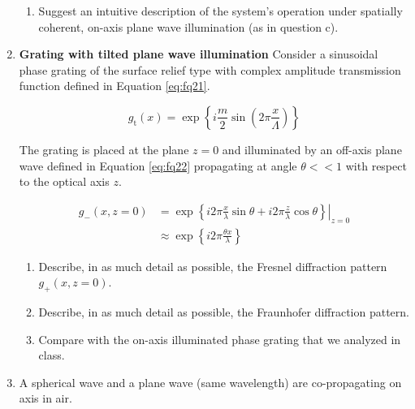 \documentclass[main.tex]{subfiles}
\begin{document}
\begin{enumerate}
\begin{enumerate}
\item{Suggest an intuitive description of the system's operation under spatially coherent, on-axis plane wave illumination (as in question c)}.

\end{enumerate}

\item{\textbf{Grating with tilted plane wave illumination} Consider a sinusoidal phase grating of the surface relief type with complex amplitude transmission function defined in Equation \ref{eq:fq21}}.

\begin{equation}\label{eq:fq21}
g_{\mathrm{t}}(x)=\exp \left\{i \frac{m}{2} \sin \left(2 \pi \frac{x}{\Lambda}\right)\right\}
\end{equation}

The grating is placed at the plane $z=0$ and illuminated by an off-axis plane wave defined in Equation \ref{eq:fq22} propagating at angle $\theta << 1$ with respect to the optical axis $z$.

\begin{equation}\label{eq:fq22}
\begin{aligned} 
g_{-}(x, z=0)&=\left.\exp \left\{i 2 \pi \frac{x}{\lambda} \sin \theta+i 2 \pi \frac{z}{\lambda} \cos \theta\right\}\right|_{z=0} \\
&\approx \exp \left\{i 2 \pi \frac{\theta x}{\lambda}\right\}
\end{aligned} 
\end{equation}

\begin{enumerate}
\item{Describe, in as much detail as possible, the Fresnel diffraction pattern $g_+(x,z=0)$.}

\item{Describe, in as much detail as possible, the Fraunhofer diffraction pattern.}

\item{Compare with the on-axis illuminated phase grating that we analyzed in class.}


\end{enumerate}
\item{A spherical wave and a plane wave (same wavelength) are co-propagating on axis in air.}


\end{enumerate}
\end{document}
